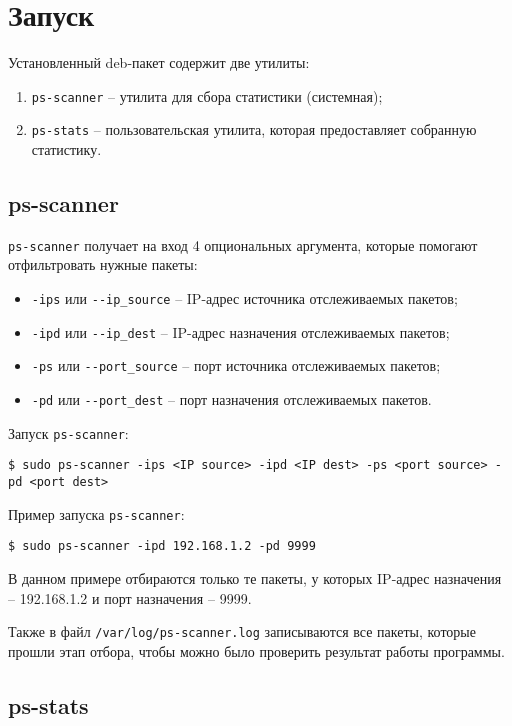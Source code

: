 \section{Запуск}
Установленный deb-пакет содержит две утилиты:
\begin{enumerate}
    \item \verb|ps-scanner| -- утилита для сбора статистики (системная);
    \item \verb|ps-stats| -- пользовательская утилита, которая предоставляет собранную статистику.
\end{enumerate}

\subsection{ps-scanner}
\verb|ps-scanner| получает на вход 4 опциональных аргумента, которые помогают отфильтровать нужные пакеты:
\begin{itemize}
    \item \verb|-ips| или \verb|--ip_source| -- IP-адрес источника отслеживаемых пакетов;
    \item \verb|-ipd| или \verb|--ip_dest| -- IP-адрес назначения отслеживаемых пакетов;
    \item \verb|-ps| или \verb|--port_source| -- порт источника отслеживаемых пакетов;
    \item \verb|-pd| или \verb|--port_dest| -- порт назначения отслеживаемых пакетов.
\end{itemize}

\linespace

Запуск \verb|ps-scanner|:
\begin{lstlisting}
$ sudo ps-scanner -ips <IP source> -ipd <IP dest> -ps <port source> -pd <port dest>
\end{lstlisting}

\linespace

Пример запуска \verb|ps-scanner|:
\begin{lstlisting}
$ sudo ps-scanner -ipd 192.168.1.2 -pd 9999
\end{lstlisting}
В данном примере отбираются только те пакеты, у которых IP-адрес назначения -- 192.168.1.2 и порт назначения -- 9999.

\linespace

Также в файл \verb|/var/log/ps-scanner.log| записываются все пакеты, которые прошли этап отбора, чтобы можно было проверить результат работы программы.

\subsection{ps-stats}

